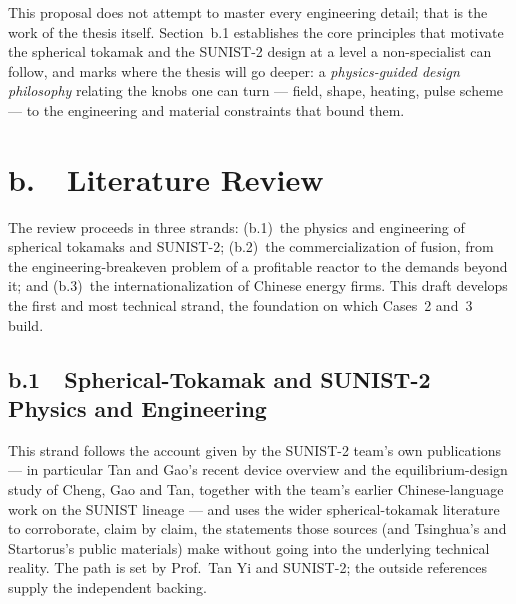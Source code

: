 \documentclass[11pt]{article}
\begin{document}
This proposal does not attempt to master every engineering detail; that is the work of the thesis itself. Section~b.1 establishes the core principles that motivate the spherical tokamak and the SUNIST-2 design at a level a non-specialist can follow, and marks where the thesis will go deeper: a \emph{physics-guided design philosophy} relating the knobs one can turn --- field, shape, heating, pulse scheme --- to the engineering and material constraints that bound them.

\section*{b.~~Literature Review}
The review proceeds in three strands: (b.1)~the physics and engineering of spherical tokamaks and SUNIST-2; (b.2)~the commercialization of fusion, from the engineering-breakeven problem of a profitable reactor to the demands beyond it; and (b.3)~the internationalization of Chinese energy firms. This draft develops the first and most technical strand, the foundation on which Cases~2 and~3 build.

\subsection*{b.1~~Spherical-Tokamak and SUNIST-2 Physics and Engineering}

This strand follows the account given by the SUNIST-2 team's own publications --- in particular Tan and Gao's recent device overview\cite{tan_iaea} and the equilibrium-design study of Cheng, Gao and Tan\cite{cheng2022}, together with the team's earlier Chinese-language work on the SUNIST lineage\cite{sunist_cn2004,tan_gao2010_cn,tan_phd2009} --- and uses the wider spherical-tokamak literature to corroborate, claim by claim, the statements those sources (and Tsinghua's and Startorus's public materials) make without going into the underlying technical reality. The path is set by Prof.\ Tan Yi and SUNIST-2; the outside references supply the independent backing.
\end{document}

